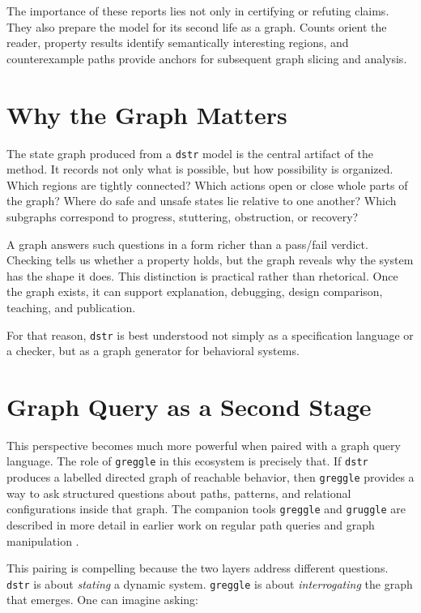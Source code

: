 \documentclass[11pt]{article}
\begin{document}
The importance of these reports lies not only in certifying or refuting claims.
They also prepare the model for its second life as a graph. Counts orient the
reader, property results identify semantically interesting regions, and
counterexample paths provide anchors for subsequent graph slicing and analysis.

\section{Why the Graph Matters}

The state graph produced from a \texttt{dstr} model is the central artifact of
the method. It records not only what is possible, but how possibility is
organized. Which regions are tightly connected? Which actions open or close
whole parts of the graph? Where do safe and unsafe states lie relative to one
another? Which subgraphs correspond to progress, stuttering, obstruction, or
recovery?

A graph answers such questions in a form richer than a pass/fail verdict.
Checking tells us whether a property holds, but the graph reveals why the system
has the shape it does. This distinction is practical rather than rhetorical.
Once the graph exists, it can support explanation, debugging, design
comparison, teaching, and publication.

For that reason, \texttt{dstr} is best understood not simply as a specification
language or a checker, but as a graph generator for behavioral systems.

\section{Graph Query as a Second Stage}

This perspective becomes much more powerful when paired with a graph query
language. The role of \texttt{greggle} in this ecosystem is precisely that. If
\texttt{dstr} produces a labelled directed graph of reachable behavior, then
\texttt{greggle} provides a way to ask structured questions about paths,
patterns, and relational configurations inside that graph. The companion tools
\texttt{greggle} and \texttt{gruggle} are described in more detail in earlier
work on regular path queries and graph manipulation
\cite{Majumder2026GreggleGruggle}.

This pairing is compelling because the two layers address different questions.
\texttt{dstr} is about \emph{stating} a dynamic system. \texttt{greggle} is
about \emph{interrogating} the graph that emerges. One can imagine asking:
\end{document}
